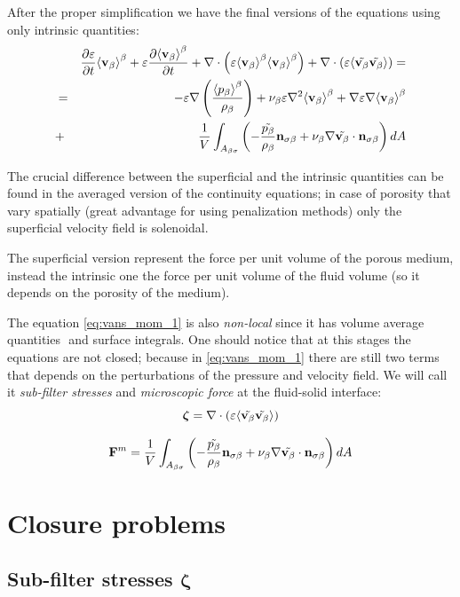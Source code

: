 After the proper simplification we have the final versions of the equations using only intrinsic quantities:
\begin{eqnarray}
& & \frac{\partial \varepsilon}{\partial t}{\left< \textbf{v}_{\beta} \right>}^{\beta} + \varepsilon \frac{\partial {\left< \textbf{v}_{\beta}\right>}^{\beta}}{\partial t} + \nabla \cdot \left(\varepsilon {\left< \textbf{v}_{\beta}\right>}^{\beta}{\left< \textbf{v}_{\beta} \right>}^{\beta}\right)   + \nabla \cdot \left(\varepsilon{\left< \tilde{\textbf{v}_{\beta}} \tilde{\textbf{v}_{\beta}} \right>}\right) = \nonumber \\
&=& -\varepsilon \nabla \left(\dfrac{{\left< p_{\beta} \right>}^{\beta}}{\rho_{\beta}}\right) + \nu_{\beta} \varepsilon \nabla^2 {\left< \textbf{v}_{\beta} \right>}^{\beta} +  \nabla \varepsilon \nabla {\left< \textbf{v}_{\beta}\right>}^{\beta} \nonumber \\
&+& \dfrac{1}{V} \int_{A_{\beta \sigma}} \left(-\dfrac{\tilde{p_{\beta}}}{\rho_{\beta}} \mathbf{n}_{\sigma \beta}  + \nu_{\beta} \nabla \tilde{\textbf{v}_{\beta}} \cdot \mathbf{n}_{\sigma \beta}\right) dA
\label{eq:vans_mom_1}
\end{eqnarray}


The crucial difference between the superficial and the intrinsic quantities can be found in the averaged version of the continuity equations; in case of porosity that vary spatially (great advantage for using penalization methods) only the superficial velocity field is solenoidal.

The superficial version represent the force per unit volume of the porous medium, instead the intrinsic one the force per unit volume of the fluid volume (so it depends on the porosity of the medium). 

The equation \eqref{eq:vans_mom_1} is also \textit{non-local} since it has volume average quantities $ $ and surface integrals.
One should notice that at this stages the equations are not closed; because in \eqref{eq:vans_mom_1} there are still two terms that depends on the perturbations of the pressure and velocity field.
We will call it \textit{sub-filter stresses} and \textit{microscopic force} at the fluid-solid interface:
$$
\boldsymbol{\zeta} = \nabla \cdot \left(\varepsilon{\left< \tilde{\textbf{v}_{\beta}} \tilde{\textbf{v}_{\beta}} \right>}\right)
$$

$$
\mathbf{F}^m = \dfrac{1}{V} \int_{A_{\beta \sigma}} \left(-\dfrac{\tilde{p_{\beta}}}{\rho_{\beta}} \mathbf{n}_{\sigma \beta}  + \nu_{\beta} \nabla \tilde{\textbf{v}_{\beta}} \cdot \mathbf{n}_{\sigma \beta}\right) dA
$$



\section{Closure problems}

\subsection{Sub-filter stresses $\boldsymbol{\zeta}$}

